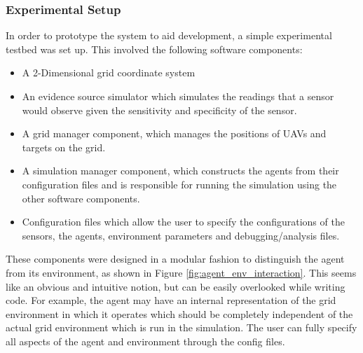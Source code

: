 \subsubsection{Experimental Setup}
In order to prototype the system to aid development, a simple experimental testbed was set up. This involved the following software components:
\begin{itemize}
    \item A 2-Dimensional grid coordinate system
    \item An evidence source simulator which simulates the readings that a sensor would observe given the sensitivity and specificity of the sensor.
    \item A grid manager component, which manages the positions of UAVs and targets on the grid.
    \item A simulation manager component, which constructs the agents from their configuration files and is responsible for running the simulation using the other software components.
    \item Configuration files which allow the user to specify the configurations of the sensors, the agents, environment parameters and debugging/analysis files.
\end{itemize}
These components were designed in a modular fashion to distinguish the agent from its environment, as shown in Figure \ref{fig:agent_env_interaction}. This seems like an obvious and intuitive notion, but can be easily overlooked while writing code. For example, the agent may have an internal representation of the grid environment in which it operates which should be completely independent of the actual grid environment which is run in the simulation. The user can fully specify all aspects of the agent and environment through the config files.

